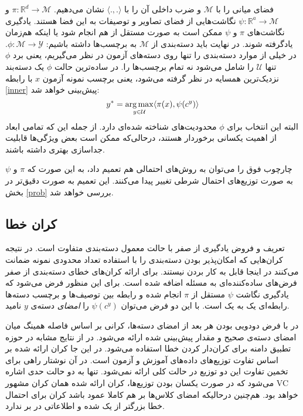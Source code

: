  فضای میانی را با $ \mathcal{M} $ و ضرب داخلی آن را با  $\langle ., . \rangle $ نشان می‌دهیم. 
 $ \pi : \mathbb{R}^d \to \mathcal{M}$ 
 و
 $ \psi : \mathbb{R}^a \to \mathcal{M}$ 
نگاشت‌هایی از فضای تصاویر و توصیفات به این فضا هستند. 
یادگیری نگاشت‌های  $\pi$ و $\psi$ ممکن است به صورت مستقل از هم انجام شود یا اینکه هم‌زمان یادگرفته شوند. در نهایت باید دسته‌بندی از  $ \mathcal{M} $ به برچسب‌ها داشته باشیم:
 $ \phi : \mathcal{M} \to \mathcal{Y}$.
 در خیلی از موارد دسته‌بندی را تنها روی دسته‌های آزمون در نظر می‌گیریم، یعنی برد $\phi$ تنها $ \mathcal{U}$ را شامل می‌شود نه تمام برچسب‌ها را.
در ساده‌ترین حالت $\phi$ یک دسته‌بند نزدیک‌ترین همسایه در نظر گرفته می‌شود، یعنی برچسب نمونه آزمون  $x$ با رابطه \ref{inner} پیش‌بینی خواهد شد:
\begin{equation}\label{inner}
y^* = \operatorname*{arg\,max}_{y \in \mathcal{U}} \langle \pi(x), \psi(c^y) \rangle
\end{equation}
البته این انتخاب برای  $\phi$ محدودیت‌های شناخته شده‌ای دارد. از جمله این که تمامی ابعاد از اهمیت یکسانی برخوردار هستند، درحالی‌که ممکن است بعض ویژگی‌ها قابلیت جداسازی بهتری داشته باشند. 

چارچوب فوق را می‌توان به روش‌های احتمالی هم تعمیم داد، به این صورت که $\pi$ و $\psi$ به صورت توزیع‌های احتمال شرطی تغییر پیدا می‌کنند. این تعمیم به صورت دقیق‌تر در بخش \ref{prob} بررسی خواهد شد. 


\subsection{کران خطا}\label{bound}
تعریف و فروض یادگیری از صفر با حالت معمول دسته‌بندی متفاوت است. در نتیجه کران‌هایی که امکان‌پذیر بودن دسته‌بندی را با استفاده تعداد محدودی نمونه ضمانت می‌کنند  در اینجا قابل به کار بردن نیستند. برای ارائه کران‌های خطای دسته‌بندی از صفر فرض‌های ساده‌کننده‌ای به مسئله اضافه شده است. برای این منظور فرض می‌شود که یادگیری نگاشت $\psi$ مستقل از $\pi$ انجام شده و رابطه بین توصیف‌ها و برچسب دسته‌ها رابطه‌ای یک به یک است. با این دو فرض می‌توان $\psi(c^y) $ را \emph{ امضای}  دسته‌ی $y$ نامید. 

در \cite{hinton09} با فرض دودویی بودن هر بعد از امضای دسته‌ها، کرانی بر اساس فاصله همینگ 
میان امضای دسته‌ی صحیح و مقدار پیش‌بینی شده ارائه می‌شود. در \cite{emb15} از نتایج مشابه در حوزه تطبیق دامنه برای کران‌دار کردن خطا استفاده می‌شود. در این جا کران ارائه شده بر اساس تفاوت توزیع‌های داده‌های آموزش و آزمون است. در آن نوشتار راهی برای تخمین تفاوت این دو توزیع در حالت کلی ارائه نمی‌شود. تنها به دو حالت حدی اشاره می‌شود که در صورت یکسان بودن توزیع‌ها، کران ارائه شده همان کران مشهور VC \cite{vapnik} خواهد بود. هم‌چنین درحالیکه امضای کلاس‌ها بر هم کاملا عمود باشد کران برای احتمال خطا بزرگتر از یک شده و اطلاعاتی در بر ندارد. 
